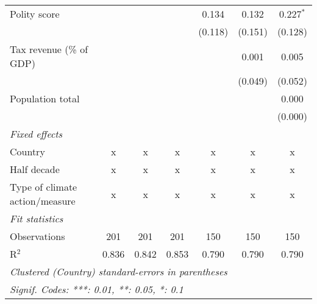 \begin{tabular}{lcccccc}
   Polity score                                                       &         &               &                & 0.134          & 0.132          & 0.227$^{*}$\\   
                                                                      &         &               &                & (0.118)        & (0.151)        & (0.128)\\   
   Tax revenue (\% of GDP)                                            &         &               &                &                & 0.001          & 0.005\\   
                                                                      &         &               &                &                & (0.049)        & (0.052)\\   
   Population total                                                   &         &               &                &                &                & 0.000\\   
                                                                      &         &               &                &                &                & (0.000)\\   
   \emph{Fixed effects}\\
   Country                                                            & x       & x             & x              & x              & x              & x\\  
   Half decade                                                        & x       & x             & x              & x              & x              & x\\  
   Type of climate action/measure                                     & x       & x             & x              & x              & x              & x\\  
   \midrule \emph{Fit statistics}\\
   Observations                                                       & 201     & 201           & 201            & 150            & 150            & 150\\  
   R$^2$                                                              & 0.836   & 0.842         & 0.853          & 0.790          & 0.790          & 0.790\\  
   \midrule
   \multicolumn{7}{l}{\emph{Clustered (Country) standard-errors in parentheses}}\\
   \multicolumn{7}{l}{\emph{Signif. Codes: ***: 0.01, **: 0.05, *: 0.1}}\\
\end{tabular}
\par\endgroup


